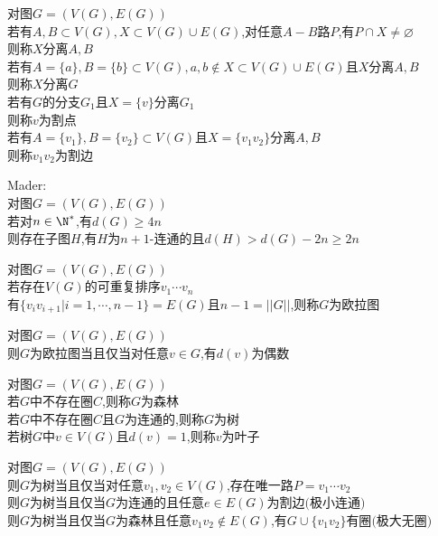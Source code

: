 \begin{dingyi}
对图$G=(V(G),E(G))$\\
若有$A,B\subset V(G),X\subset V(G)\cup E(G)$,对任意$A-B$路$P$,有$P\cap X\neq \varnothing$\\
则称$X$分离$A,B$\\
若有$A=\{a\},B=\{b\}\subset V(G),a,b\notin X\subset V(G)\cup E(G)$且$X$分离$A,B$\\
则称$X$分离$G$\\
若有$G$的分支$G_1$且$X=\{v\}$分离$G_1$\\
则称$v$为割点\\
若有$A=\{v_1\},B=\{v_2\}\subset V(G)$且$X=\{v_1v_2\}$分离$A,B$\\
则称$v_1v_2$为割边
\end{dingyi}

\begin{dingli}
Mader:\\
对图$G=(V(G),E(G))$\\
若对$n\in\N^*$,有$d(G)\geq 4n$\\
则存在子图$H$,有$H$为$n+1$-连通的且$d(H)> d(G)-2n\geq 2n$
\end{dingli}

\begin{dingyi}
对图$G=(V(G),E(G))$\\
若存在$V(G)$的可重复排序$v_1\cdots v_n$\\
有$\{v_iv_{i+1}|i=1,\cdots,n-1\}=E(G)$且$n-1=||G||$,则称$G$为欧拉图
\end{dingyi}

\begin{dingli}
对图$G=(V(G),E(G))$\\
则$G$为欧拉图当且仅当对任意$v\in G$,有$d(v)$为偶数
\end{dingli}

\begin{dingyi}
对图$G=(V(G),E(G))$\\
若$G$中不存在圈$C$,则称$G$为森林\\
若$G$中不存在圈$C$且$G$为连通的,则称$G$为树\\
若树$G$中$v\in V(G)$且$d(v)=1$,则称$v$为叶子
\end{dingyi}

\begin{dingli}
对图$G=(V(G),E(G))$\\
则$G$为树当且仅当对任意$v_1,v_2\in V(G)$,存在唯一路$P=v_1\cdots v_2$\\
则$G$为树当且仅当$G$为连通的且任意$e\in E(G)$为割边$($极小连通$)$\\
则$G$为树当且仅当$G$为森林且任意$v_1v_2\notin E(G)$,有$G\cup\{v_1v_2\}$有圈$($极大无圈$)$
\end{dingli}

